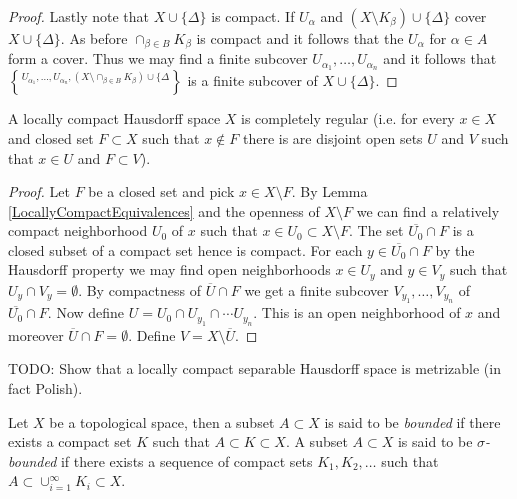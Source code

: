 \begin{proof}
Lastly note that $X \cup \lbrace \Delta \rbrace$ is compact.  If $U_\alpha$ and $(X \setminus K_\beta) \cup \lbrace \Delta \rbrace$ cover $X \cup \lbrace \Delta \rbrace$.  As before $\cap_{\beta \in B} K_\beta$ is compact and it follows that the $U_\alpha$ for $\alpha \in A$ form a cover.  Thus we may find a finite subcover $U_{\alpha_1}, \dotsc, U_{\alpha_n}$
and it follows that $U_{\alpha_1}, \dotsc, U_{\alpha_n}, (X \setminus \cap_{\beta \in B} K_\beta) \cup \lbrace \Delta \brace$ is a finite subcover of $X \cup \lbrace \Delta \rbrace$.
\end{proof}

\begin{prop}\label{CompleteRegularityLCH}A locally compact Hausdorff space $X$ is completely regular
  (i.e. for every $x \in X$ and closed set $F \subset X$ such that $x
  \notin F$ there is are disjoint open sets $U$ and $V$ such that $x
  \in U$ and $F \subset V$).
\end{prop}
\begin{proof}
Let $F$ be a closed set and pick $x \in X \setminus F$.  By Lemma
\ref{LocallyCompactEquivalences} and the openness of $X \setminus F$
we can find a relatively compact neighborhood $U_0$ of $x$ such that $x
\in U_0 \subset X \setminus F$.  The set $\overline{U_0} \cap F$ is a closed subset of a compact
set hence is compact.  For each $y \in \overline{U_0} \cap F$ by the
Hausdorff property we may find open neighborhoods $x \in U_y$ and $y
\in V_y$ such that $U_y \cap V_y = \emptyset$.  By compactness of
$\overline{U} \cap F$ we get a finite subcover $V_{y_1}, \dotsc,
V_{y_n}$ of $\overline{U_0} \cap F$.  Now define $U = U_0 \cap U_{y_1}
\cap \dotsb U_{y_n}$.  This is an open neighborhood of $x$ and
moreover $\overline{U} \cap F = \emptyset$.  Define $V = X \setminus \overline{U}$.
\end{proof}

TODO: Show that a locally compact separable Hausdorff space is
metrizable (in fact Polish).

\begin{defn}Let $X$ be a topological space, then a subset $A \subset
  X$ is said to be \emph{bounded} if there exists a compact set $K$
  such that 
  $A \subset K \subset X$.  A subset $A \subset
  X$ is said to be \emph{$\sigma$-bounded} if there exists a sequence
  of compact sets $K_1, K_2, \dotsc$ such that
$A \subset  \cup_{i=1}^\infty K_i \subset X$.
\end{defn}

